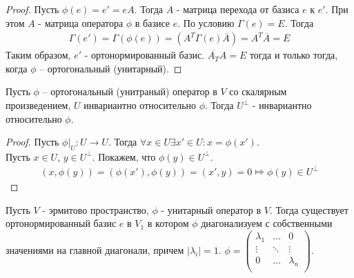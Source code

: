 \begin{proof}
    Пусть $\phi(e) = e' = e A$. Тогда $A$ - матрица перехода от базиса $e$ к $e'$. При этом $A$ - матрица оператора $\phi$ в базисе $e$. По условию $\Gamma(e) = E$. Тогда 
    \begin{gather*}
        \Gamma(e') = \Gamma(\phi(e)) = (A^T \Gamma(e) \overline{A}) = A^T \overline{A} = E
    \end{gather*}
    Таким образом, $e'$ - ортонормированный базис.
    $\overline{A_T} A = E$ тогда и только тогда, когда $\phi$ -- ортогональный (унитарный).
\end{proof}

\begin{proposition}
    Пусть $\phi$ -- ортогональный (унитраный) оператор в $V$ со скалярным произведением, $U$ инвариантно относительно $\phi$. Тогда $U^{\perp}$ - инвариантно относительно $\phi$.
\end{proposition}

\begin{proof}
    Пусть $\phi \vert_{U} : U \to U$. Тогда $\forall x \in U \exists x' \in U: x = \phi(x')$. \\
    Пусть $x \in U$, $y \in U^{\perp}$. Покажем, что $\phi(y) \in U^{\perp}$.
    \begin{gather*}
        (x, \phi(y)) = (\phi(x'), \phi(y)) = (x', y) = 0 \Mapsto \phi(y) \in U^{\perp}
    \end{gather*}
\end{proof}

\begin{theorem}
    Пусть $V$ - эрмитово пространство, $\phi$ - унитарный оператор в $V$. Тогда существует ортонормированный базис $e$ в $V_1$ в котором $\phi$ диагонализуем с собственными значениями на главной диагонали, причем $|\lambda_i| = 1$.
    $\phi = 
    \begin{pmatrix}
        \lambda_1  & \dots & 0 \\
		\vdots & \ddots & \vdots \\
        0 & \dots & \lambda_n \\
    \end{pmatrix}$.
\end{theorem}

